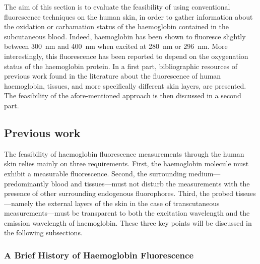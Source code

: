The aim of this section is to evaluate the feasibility of using conventional fluorescence techniques on the human skin, in order to gather information about the oxidation or carbamation status of the haemoglobin contained in the subcutaneous blood. Indeed, haemoglobin has been shown to fluoresce slightly between 300~nm and 400~nm when excited at 280~nm or 296~nm. More interestingly, this fluorescence has been reported to depend on the oxygenation status of the haemoglobin protein\cite{itoh1981, hirsch2003}. In a first part, bibliographic resources of previous work found in the literature about the fluorescence of human haemoglobin, tissues, and more specifically different skin layers, are presented. The feasibility of the afore-mentioned approach is then discussed in a second part.

\subsection{Previous work}\label{sect:co2hb:fluo:prev_work}

The feasibility of haemoglobin fluorescence measurements through the human skin relies mainly on three requirements. First, the haemoglobin molecule must exhibit a measurable fluorescence. Second, the surrounding medium---predominantly blood and tissues---must not disturb the measurements with the presence of other surrounding endogenous fluorophores. Third, the probed tissues---namely the external layers of the skin in the case of transcutaneous measurements---must be transparent to both the excitation wavelength and the emission wavelength of haemoglobin. These three key points will be discussed in the following subsections.

\subsubsection{A Brief History of Haemoglobin Fluorescence}\label{sect:co2hb:fluo:hb_fluo}

